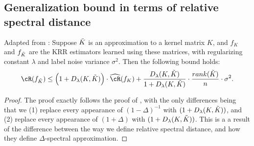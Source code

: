 \subsection{Generalization bound in terms of relative spectral distance}
\label{subsec:generalization_and_rel_spec_dist}
\begin{proposition}{Adapted from \citep{avron17}:}
	Suppose $\tilde{K}$ is an approximation to a kernel matrix $K$, and $f_{K}$ and $f_{\tilde{K}}$ are the KRR estimators learned using these matrices, with regularizing constant $\lambda$ and label noise variance $\sigma^2$. Then the following bound holds:
	\begin{eqnarray}
	\cR(f_{\tK}) \leq \Big(1+D_{\lambda}(K,\tK)\Big)\cdot \hcR(f_K) + \frac{D_{\lambda}(K,\tK)}{1+D_{\lambda}(K,\tK)}\cdot \frac{rank(\tK)}{n}\cdot\sigma^2.
	\end{eqnarray}
\end{proposition}
\begin{proof}
	The proof exactly follows the proof of \citep{avron17}, with the only differences being that we (1) replace every appearance of $(1-\Delta)^{-1}$ with $(1+D_{\lambda}(K,\tilde{K}))$, and (2) replace every appearance of $(1+\Delta)$ with $(1+D_{\lambda}(K,\tilde{K}))$.  This is a a result of the difference between the way we define relative spectral distance, and how they define $\Delta$-spectral approximation.
\end{proof}